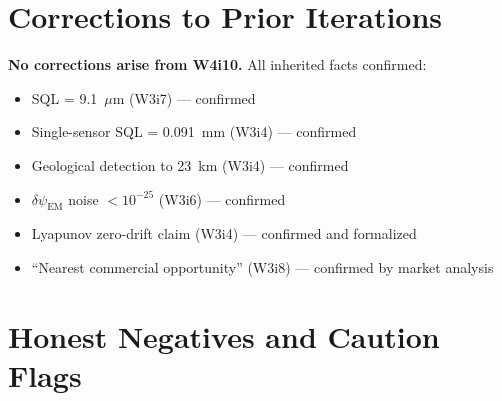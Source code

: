 \documentclass[11pt]{article}
\theoremstyle{definition}
\theoremstyle{remark}
\newcommand{\dpsiem}{\delta\psi_{\mathrm{EM}}}
\begin{document}
\section{Corrections to Prior Iterations}
\label{sec:corrections}

\textbf{No corrections arise from W4i10.} All inherited facts confirmed:

\begin{itemize}[nosep]
\item SQL = 9.1~$\mu$m (W3i7) --- confirmed
\item Single-sensor SQL = 0.091~mm (W3i4) --- confirmed
\item Geological detection to 23~km (W3i4) --- confirmed
\item $\dpsiem$ noise $< 10^{-25}$ (W3i6) --- confirmed
\item Lyapunov zero-drift claim (W3i4) --- confirmed and formalized
\item ``Nearest commercial opportunity'' (W3i8) --- confirmed by market analysis
\end{itemize}

\section{Honest Negatives and Caution Flags}
\label{sec:honest}
\end{document}
